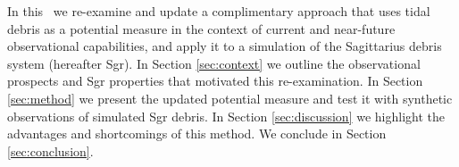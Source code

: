 %
%

In this \article\ we re-examine and update a complimentary approach that uses tidal debris as a potential measure \citep[originally proposed by][]{johnston99a} in the context of current and near-future observational capabilities, and apply it to a simulation of the Sagittarius debris system (hereafter Sgr).
In Section \ref{sec:context} we outline the observational prospects and Sgr properties that motivated this re-examination.
In Section \ref{sec:method} we present the updated potential measure and test it with synthetic observations of simulated Sgr debris.
In Section \ref{sec:discussion} we highlight the advantages and shortcomings of this method.
We conclude in Section \ref{sec:conclusion}.


